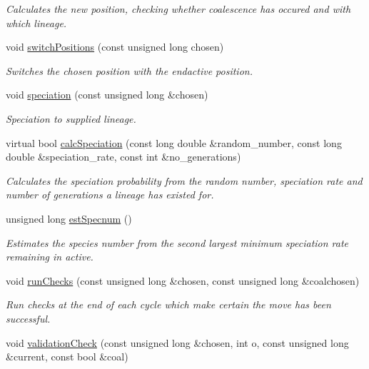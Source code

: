 \begin{DoxyCompactItemize}
\begin{DoxyCompactList}\small\item\em Calculates the new position, checking whether coalescence has occured and with which lineage. \end{DoxyCompactList}\item 
void \hyperlink{class_tree_a89e2fa28e3d637b4bc034fb3afc53e81}{switch\+Positions} (const unsigned long chosen)
\begin{DoxyCompactList}\small\item\em Switches the chosen position with the endactive position. \end{DoxyCompactList}\item 
void \hyperlink{class_tree_a05c9e44f1a4d7af83e65b6c4565b1b28}{speciation} (const unsigned long \&chosen)
\begin{DoxyCompactList}\small\item\em Speciation to supplied lineage. \end{DoxyCompactList}\item 
virtual bool \hyperlink{class_tree_a0a6fd214c1e4b77955add6ffa9f76d5d}{calc\+Speciation} (const long double \&random\+\_\+number, const long double \&speciation\+\_\+rate, const int \&no\+\_\+generations)
\begin{DoxyCompactList}\small\item\em Calculates the speciation probability from the random number, speciation rate and number of generations a lineage has existed for. \end{DoxyCompactList}\item 
unsigned long \hyperlink{class_tree_a8f4c4cbc5ad516f0fde489c9a826e676}{est\+Specnum} ()
\begin{DoxyCompactList}\small\item\em Estimates the species number from the second largest minimum speciation rate remaining in active. \end{DoxyCompactList}\item 
void \hyperlink{class_tree_a3820405a51ac9043346d37b0e267d364}{run\+Checks} (const unsigned long \&chosen, const unsigned long \&coalchosen)
\begin{DoxyCompactList}\small\item\em Run checks at the end of each cycle which make certain the move has been successful. \end{DoxyCompactList}\item 
void \hyperlink{class_tree_aa60dbbf173231fb224e2c6792cbae292}{validation\+Check} (const unsigned long \&chosen, int o, const unsigned long \&current, const bool \&coal)

\end{DoxyCompactItemize}
